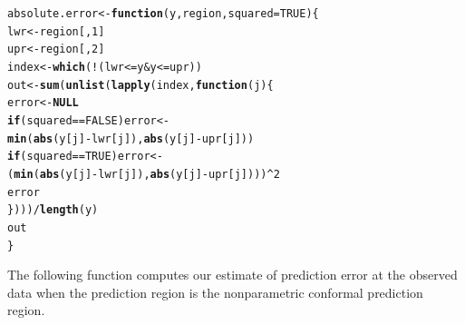 \documentclass[11pt]{article}\usepackage[]{graphicx}\usepackage[]{color}
\makeatletter
\newcommand{\hlnum}[1]{\textcolor[rgb]{0.686,0.059,0.569}{#1}}%
\newcommand{\hlopt}[1]{\textcolor[rgb]{0,0,0}{#1}}%
\newcommand{\hlstd}[1]{\textcolor[rgb]{0.345,0.345,0.345}{#1}}%
\newcommand{\hlkwa}[1]{\textcolor[rgb]{0.161,0.373,0.58}{\textbf{#1}}}%
\newcommand{\hlkwb}[1]{\textcolor[rgb]{0.69,0.353,0.396}{#1}}%
\newcommand{\hlkwc}[1]{\textcolor[rgb]{0.333,0.667,0.333}{#1}}%
\newcommand{\hlkwd}[1]{\textcolor[rgb]{0.737,0.353,0.396}{\textbf{#1}}}%
\newenvironment{kframe}{%
 \def\at@end@of@kframe{}%
 \ifinner\ifhmode%
  \def\at@end@of@kframe{\end{minipage}}%
  \begin{minipage}{\columnwidth}%
 \fi\fi%
 \def\FrameCommand##1{\hskip\@totalleftmargin \hskip-\fboxsep
 \colorbox{shadecolor}{##1}\hskip-\fboxsep
     \hskip-\linewidth \hskip-\@totalleftmargin \hskip\columnwidth}%
 \MakeFramed {\advance\hsize-\width
   \@totalleftmargin\z@ \linewidth\hsize
   \@setminipage}}%
 {\par\unskip\endMakeFramed%
 \at@end@of@kframe}
\newenvironment{knitrout}{}{} %
\makeatother
\begin{document}
\begin{knitrout}
\color{fgcolor}\begin{kframe}
\begin{alltt}
\hlstd{absolute.error} \hlkwb{<-} \hlkwa{function}\hlstd{(}\hlkwc{y}\hlstd{,} \hlkwc{region}\hlstd{,} \hlkwc{squared} \hlstd{=} \hlnum{TRUE}\hlstd{)\{}
  \hlstd{lwr} \hlkwb{<-} \hlstd{region[,} \hlnum{1}\hlstd{]}
  \hlstd{upr} \hlkwb{<-} \hlstd{region[,} \hlnum{2}\hlstd{]}
  \hlstd{index} \hlkwb{<-} \hlkwd{which}\hlstd{(}\hlopt{!}\hlstd{(lwr} \hlopt{<=} \hlstd{y} \hlopt{&} \hlstd{y} \hlopt{<=} \hlstd{upr))}
  \hlstd{out} \hlkwb{<-} \hlkwd{sum}\hlstd{(}\hlkwd{unlist}\hlstd{(}\hlkwd{lapply}\hlstd{(index,} \hlkwa{function}\hlstd{(}\hlkwc{j}\hlstd{)\{}
    \hlstd{error} \hlkwb{<-} \hlkwa{NULL}
    \hlkwa{if}\hlstd{(squared} \hlopt{==} \hlnum{FALSE}\hlstd{) error} \hlkwb{<-}
      \hlkwd{min}\hlstd{(}\hlkwd{abs}\hlstd{(y[j]} \hlopt{-} \hlstd{lwr[j]),} \hlkwd{abs}\hlstd{(y[j]} \hlopt{-} \hlstd{upr[j]))}
    \hlkwa{if}\hlstd{(squared} \hlopt{==} \hlnum{TRUE}\hlstd{) error} \hlkwb{<-}
      \hlstd{(}\hlkwd{min}\hlstd{(}\hlkwd{abs}\hlstd{(y[j]} \hlopt{-} \hlstd{lwr[j]),} \hlkwd{abs}\hlstd{(y[j]} \hlopt{-} \hlstd{upr[j])))}\hlopt{^}\hlnum{2}
    \hlstd{error}
  \hlstd{\})))} \hlopt{/} \hlkwd{length}\hlstd{(y)}
  \hlstd{out}
\hlstd{\}}
\end{alltt}
\end{kframe}
\end{knitrout}

The following function computes our estimate of prediction error at the 
observed data when the prediction region is the nonparametric conformal 
prediction region.
\end{document}
